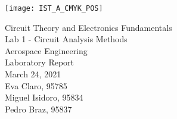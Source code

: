 
\thispagestyle {empty}

\texttt{[image: IST\_A\_CMYK\_POS]}

\begin{center}
%
\vspace{1.0cm}

\vspace{2cm}
{\FontLb Circuit Theory and Electronics Fundamentals} \\ %
\vspace{1cm}
{\FontLb Lab 1 - Circuit Analysis Methods} \\ %
\vspace{1cm}
{\FontLb Aerospace Engineering} \\ %
\vspace{4cm}
{\FontSn Laboratory Report} \\
\vspace{0.5cm}
{\FontSn March 24, 2021} \\ %
\vspace{7cm}
{\FontSn Eva Claro, 95785} \\
\vspace{0.5cm}
{\FontSn Miguel Isidoro, 95834} \\
\vspace{0.5cm}
{\FontSn Pedro Braz, 95837} \\
\newpage
%
\end{center}
